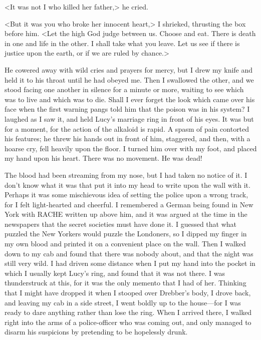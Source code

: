 <It was not I who killed her father,> he cried.

<But it was you who broke her innocent heart,> I shrieked, thrusting the box before him. <Let the high God judge between us. Choose and eat. There is death in one and life in the other. I shall take what you leave. Let us see if there is justice upon the earth, or if we are ruled by chance.>

He cowered away with wild cries and prayers for mercy, but I drew my knife and held it to his throat until he had obeyed me. Then I swallowed the other, and we stood facing one another in silence for a minute or more, waiting to see which was to live and which was to die. Shall I ever forget the look which came over his face when the first warning pangs told him that the poison was in his system? I laughed as I saw it, and held Lucy's marriage ring in front of his eyes. It was but for a moment, for the action of the alkaloid is rapid. A spasm of pain contorted his features; he threw his hands out in front of him, staggered, and then, with a hoarse cry, fell heavily upon the floor. I turned him over with my foot, and placed my hand upon his heart. There was no movement. He was dead!

The blood had been streaming from my nose, but I had taken no notice of it. I don't know what it was that put it into my head to write upon the wall with it. Perhaps it was some mischievous idea of setting the police upon a wrong track, for I felt light-hearted and cheerful. I remembered a German being found in New York with RACHE written up above him, and it was argued at the time in the newspapers that the secret societies must have done it. I guessed that what puzzled the New Yorkers would puzzle the Londoners, so I dipped my finger in my own blood and printed it on a convenient place on the wall. Then I walked down to my cab and found that there was nobody about, and that the night was still very wild. I had driven some distance when I put my hand into the pocket in which I usually kept Lucy's ring, and found that it was not there. I was thunderstruck at this, for it was the only memento that I had of her. Thinking that I might have dropped it when I stooped over Drebber's body, I drove back, and leaving my cab in a side street, I went boldly up to the house—for I was ready to dare anything rather than lose the ring. When I arrived there, I walked right into the arms of a police-officer who was coming out, and only managed to disarm his suspicions by pretending to be hopelessly drunk.

